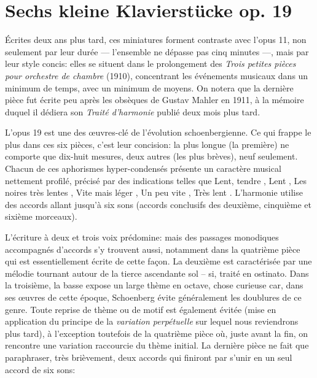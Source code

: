 \documentclass[11pt,a4paper]{scrreprt}
\begin{document}
\section{Sechs kleine Klavierstücke op. 19}
Écrites deux ans plus tard, ces \og{} miniatures \fg{} forment contraste avec l'opus 11, non seulement par leur durée --- l'ensemble ne dépasse pas cinq minutes ---, mais par leur style concis: elles se situent dans le prolongement des \emph{Trois petites pièces pour orchestre de chambre} (1910), concentrant les événements musicaux dans un minimum de temps, avec un minimum de moyens. On notera que la dernière pièce fut écrite peu après les obsèques de Gustav Mahler en 1911, à la mémoire duquel il dédiera son \emph{Traité d'harmonie} publié deux mois plus tard.

L'opus 19 est une des \oe{}uvres-clé de l'évolution schoenbergienne. Ce qui frappe le plus dans ces six pièces, c'est leur concision: la plus longue (la première) ne comporte que dix-huit mesures, deux autres (les plus brèves), neuf seulement. Chacun de ces aphorismes hyper-condensés présente un caractère musical nettement profilé, précisé par des indications telles que \og{} Lent, tendre \fg{}, \og{} Lent \fg{}, \og{} Les noires très lentes \fg{}, \og{} Vite mais léger \fg{}, \og{} Un peu vite \fg{}, \og{} Très lent \fg{}. L'harmonie utilise des accords allant jusqu'à six sons (accords conclusifs des deuxième, cinquième et sixième morceaux).

L'écriture à deux et trois voix prédomine: mais des passages monodiques accompagnés d'accords s'y trouvent aussi, notamment dans la quatrième pièce qui est essentiellement écrite de cette façon. La deuxième est caractérisée par une mélodie tournant autour de la tierce ascendante sol -- si, traité en ostinato. Dans la troisième, la basse expose \fetap{}\fetap{} un large thème en octave, chose curieuse car, dans ses \oe{}uvres de cette époque, Schoenberg évite généralement les doublures de ce genre. Toute reprise de thème ou de motif est également évitée (mise en application du principe de la \emph{variation perpétuelle}\label{var_perp} sur lequel nous reviendrons plus tard), à l'exception toutefois de la quatrième pièce où, juste avant la fin, on rencontre une variation raccourcie du thème initial. La dernière pièce ne fait que paraphraser, très brièvement, deux accords qui finiront par s'unir en un seul accord de six sons:

\begin{center}
\end{center}
\end{document}
